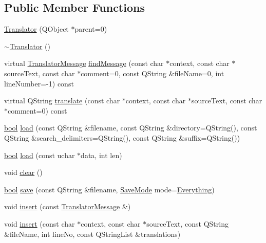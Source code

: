 \subsection*{Public Member Functions}
\begin{DoxyCompactItemize}
\item 
\hyperlink{classTranslator_adea9a7fabf45b7e89a91f8acf87034ff}{Translator} (Q\+Object $\ast$parent=0)
\item 
\hyperlink{classTranslator_a9c262ba866126a6a35e979a64d7e3518}{$\sim$\+Translator} ()
\item 
virtual \hyperlink{classTranslatorMessage}{Translator\+Message} \hyperlink{classTranslator_ad8ed775f8a3375e029fc321d85e35de6}{find\+Message} (const char $\ast$context, const char $\ast$source\+Text, const char $\ast$comment=0, const Q\+String \&file\+Name=0, int line\+Number=-\/1) const 
\item 
virtual Q\+String \hyperlink{classTranslator_a032376fa349510a324c3e8e785ec8cab}{translate} (const char $\ast$context, const char $\ast$source\+Text, const char $\ast$comment=0) const 
\item 
\hyperlink{compiler_8h_abb452686968e48b67397da5f97445f5b}{bool} \hyperlink{classTranslator_ae0cc0c124c3c00c87aae603c2ecc3be0}{load} (const Q\+String \&filename, const Q\+String \&directory=Q\+String(), const Q\+String \&search\+\_\+delimiters=Q\+String(), const Q\+String \&suffix=Q\+String())
\item 
\hyperlink{compiler_8h_abb452686968e48b67397da5f97445f5b}{bool} \hyperlink{classTranslator_af7945fd24f0b03dcaf31c500b09eaf5e}{load} (const uchar $\ast$data, int len)
\item 
void \hyperlink{classTranslator_a64ceb9a2ce9ac0a4118136166fd28a00}{clear} ()
\item 
\hyperlink{compiler_8h_abb452686968e48b67397da5f97445f5b}{bool} \hyperlink{classTranslator_a120c98f6d21bb5ae8787b9479e37c8ef}{save} (const Q\+String \&filename, \hyperlink{classTranslator_aefe656fdfa14952a99d6d25e61749a99}{Save\+Mode} mode=\hyperlink{classTranslator_aefe656fdfa14952a99d6d25e61749a99a3847cfbd6836d9a65ac73fc641bb3085}{Everything})
\item 
void \hyperlink{classTranslator_a899fe5210b7f0c9c1aafe3c875be08b4}{insert} (const \hyperlink{classTranslatorMessage}{Translator\+Message} \&)
\item 
void \hyperlink{classTranslator_ac97cb60f40addc1b01ca21bb7196c4f9}{insert} (const char $\ast$context, const char $\ast$source\+Text, const Q\+String \&file\+Name, int line\+No, const Q\+String\+List \&translations)

\end{DoxyCompactItemize}
